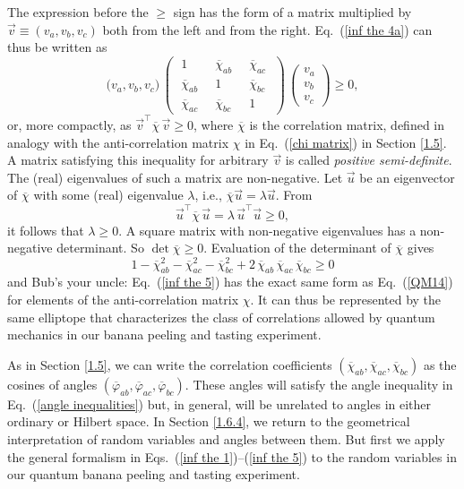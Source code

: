 The expression before the $\ge$ sign has the form of a matrix multiplied by $\vec{v} \equiv (v_a, v_b, v_c)$ both from the left and from the right. Eq.\ (\ref{inf the 4a}) can thus be written as
\begin{equation}
\Big(v_a, v_b, v_c \Big) \, \left( 
\begin{array}{ccc}
\; 1 \; & \; \overline{\chi}_{ab} \; & \;  \overline{\chi}_{ac} \; \\
\; \overline{\chi}_{ab} & \; 1 \; & \;  \overline{\chi}_{bc} \; \\
 \; \overline{\chi}_{ac} \; & \; \overline{\chi}_{bc} \; & \;  1 
\end{array}
\right) \, 
\left( \begin{array}{c}
v_a \\
v_b \\
v_c
\end{array}
\right) \ge 0,
\label{inf the 4}
\end{equation}
or, more compactly, as $\vec{v}^{\top}  \overline{\chi} \, \vec{v} \ge 0$, where $\overline{\chi}$ is the correlation matrix, defined in analogy with the anti-correlation matrix $\chi$ in Eq.\ (\ref{chi matrix}) in Section \ref{1.5}. A matrix satisfying this inequality for arbitrary $\vec{v}$ is called \emph{positive semi-definite}. The (real) eigenvalues of such a matrix are non-negative. Let $\vec{u}$ be an eigenvector of $\overline{\chi}$ with some (real) eigenvalue $\lambda$, i.e., $\overline{\chi} \vec{u} = \lambda \vec{u}$. From
\begin{equation}
\vec{u}^{\top}  \overline{\chi} \, \vec{u} = \lambda \, \vec{u}^{\top} \vec{u} \ge 0,
\end{equation}
it follows that $\lambda \ge 0$. A square matrix with non-negative eigenvalues has a non-negative determinant. So $\det{\overline{\chi}} \ge 0$. Evaluation of the determinant of $\overline{\chi}$ gives
\begin{equation}
1 - \overline{\chi}_{ab}^2 - \overline{\chi}_{ac}^2 - \overline{\chi}_{bc}^2 + 2 \, \overline{\chi}_{ab} \, \overline{\chi}_{ac} \, \overline{\chi}_{bc} \ge 0
\label{inf the 5}
\end{equation}
and Bub's your uncle: Eq.\ (\ref{inf the 5}) has the exact same form as Eq.\ (\ref{QM14}) for elements of the anti-correlation matrix $\chi$.  It can thus be represented by the same elliptope that characterizes the class of correlations allowed by quantum mechanics in our banana peeling and tasting experiment. 

As in Section  \ref{1.5}, we can write the correlation coefficients $(\overline{\chi}_{ab}, \overline{\chi}_{ac}, \overline{\chi}_{bc})$ as the cosines of angles $(\overline{\varphi}_{ab}, \overline{\varphi}_{ac}, \overline{\varphi}_{bc})$. These angles will satisfy the angle inequality in Eq.\ (\ref{angle inequalities}) but, in general, will be unrelated to angles in either ordinary or Hilbert space. In Section \ref{1.6.4}, we return to the geometrical interpretation of random variables and angles between them. But first we apply the general formalism in Eqs.\ (\ref{inf the 1})--(\ref{inf the 5}) to the random variables in our quantum banana peeling and tasting experiment.


